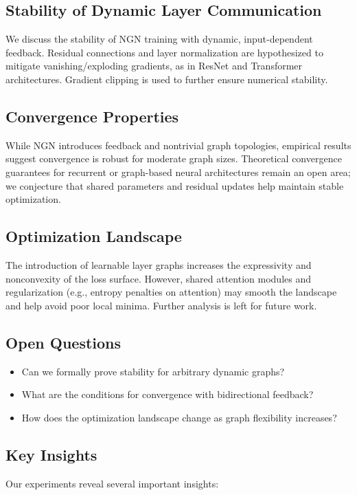 \documentclass[11pt]{article}
\begin{document}
\subsection{Stability of Dynamic Layer Communication}
We discuss the stability of NGN training with dynamic, input-dependent feedback. Residual connections and layer normalization are hypothesized to mitigate vanishing/exploding gradients, as in ResNet and Transformer architectures. Gradient clipping is used to further ensure numerical stability.

\subsection{Convergence Properties}
While NGN introduces feedback and nontrivial graph topologies, empirical results suggest convergence is robust for moderate graph sizes. Theoretical convergence guarantees for recurrent or graph-based neural architectures remain an open area; we conjecture that shared parameters and residual updates help maintain stable optimization.

\subsection{Optimization Landscape}
The introduction of learnable layer graphs increases the expressivity and nonconvexity of the loss surface. However, shared attention modules and regularization (e.g., entropy penalties on attention) may smooth the landscape and help avoid poor local minima. Further analysis is left for future work.

\subsection{Open Questions}
\begin{itemize}
    \item Can we formally prove stability for arbitrary dynamic graphs?
    \item What are the conditions for convergence with bidirectional feedback?
    \item How does the optimization landscape change as graph flexibility increases?
\end{itemize}

\subsection{Key Insights}

Our experiments reveal several important insights:
\end{document}
